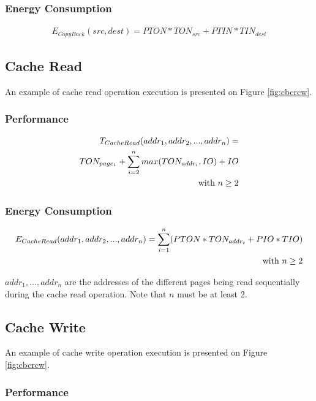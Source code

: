 \documentclass[oneside]{memoir}
\begin{document}
\subsubsection{Energy Consumption}

\begin{align} E_{CopyBack}(src, dest) = PTON*TON_{src} + PTIN*TIN_{dest} \end{align}

\subsection{Cache Read}

An example of cache read operation execution is presented on Figure \ref{fig:cbcrcw}.

\subsubsection{Performance}

\begin{align}
T_{CacheRead}(addr_1, addr_2, ... , addr_n) = 
\notag\\TON_{page_1} + \sum\limits_{i=2}^{n} max(TON_{addr_i}, IO) + IO
\notag\\\text{with } n \ge 2
\end{align}

\subsubsection{Energy Consumption}

\begin{align} 
E_{CacheRead}(addr_1, addr_2, ... , addr_n) = \sum\limits_{i=1}^{n} (PTON*TON_{addr_i} + PIO*TIO)
\notag\\\text{with } n \ge 2
\end{align}

$addr_1, ... , addr_n$ are the addresses of the different pages being read sequentially during the cache read operation. Note that $n$ must be at least 2.

\subsection{Cache Write}

An example of cache write operation execution is presented on Figure \ref{fig:cbcrcw}.

\subsubsection{Performance}
\end{document}
